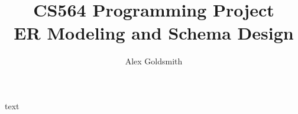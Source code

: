 \documentclass[12pt, letterpaper]{article}
\author{Alex Goldsmith}
\title{CS564 Programming Project \\
    \large ER Modeling and Schema Design}
\begin{document}
    \maketitle
    text
\end{document}
